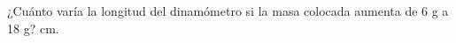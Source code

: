 ¿Cuánto varía la longitud del dinamómetro si la masa colocada aumenta de 6 g a 18 g? \fillin[6][0.5cm] cm.